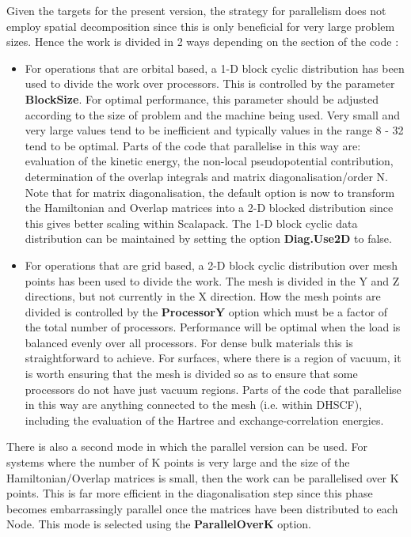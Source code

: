 Given the targets for the present version, the strategy for parallelism
does not employ spatial decomposition since this is only beneficial for
very large problem sizes. Hence the work is divided in 2 ways depending
on the section of the code :

\begin{itemize}
\item
For operations that are orbital based, a 1-D block cyclic distribution
has been used to divide the work over processors. This is controlled
by the parameter \textbf{BlockSize}.
For optimal performance, this parameter
should be adjusted according to the size of problem and the machine
being used. Very small and very large values tend to be inefficient
and typically values in the range 8 - 32 tend to be optimal. Parts of
the code that parallelise in this way are: evaluation of the kinetic
energy, the non-local pseudopotential contribution, determination of
the overlap integrals and matrix diagonalisation/order N. Note that
for matrix diagonalisation, the default option is now to transform the
Hamiltonian and Overlap matrices into a 2-D blocked distribution since
this gives better scaling within Scalapack. The 1-D block cyclic
data distribution can be maintained by setting the option \textbf{Diag.Use2D}
to false.

\item
For operations that are grid based, a 2-D block cyclic distribution
over mesh points has been used to divide the work. The mesh is divided
in the Y and Z directions, but not currently in the X direction. How
the mesh points are divided is controlled by the \textbf{ProcessorY}
option which must be a factor of the total number of processors.
Performance will be optimal when the load is balanced evenly
over all processors. For dense bulk materials this is straightforward
to achieve. For surfaces, where there is a region of vacuum, it is
worth ensuring that the mesh is divided so as to ensure that some
processors do not have just vacuum regions. Parts of the code that
parallelise in this way are anything connected to the mesh (i.e. within
DHSCF), including the evaluation of the Hartree and exchange-correlation
energies.
\end{itemize}

There is also a second mode in which the parallel version can be used. For
systems where the number of K points is very large and the size of the
Hamiltonian/Overlap matrices is small, then the work can be parallelised
over K points. This is far more efficient in the diagonalisation step
since this phase becomes embarrassingly parallel once the matrices have
been distributed to each Node. This mode is selected using the
\textbf{ParallelOverK} 
option.


